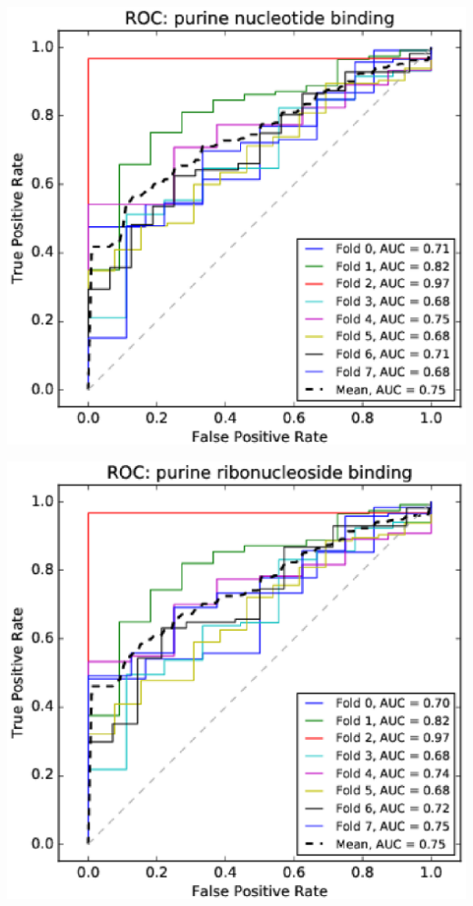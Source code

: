 \documentclass[11pt,twoside,a4paper]{book}
\newenvironment{Figure}
  {\par\medskip\noindent\minipage{\linewidth}}
  {\endminipage\par\medskip}
\begin{document}
\begin{multicols}{2}
\begin{Figure}\begin{center}\includegraphics[width=\linewidth]{figures/roc_purine_nucleotide_binding}\label{fig:roc_purine_nucleotide_binding}\end{center}\end{Figure}
\begin{Figure}\begin{center}\includegraphics[width=\linewidth]{figures/roc_purine_ribonucleoside_binding}\label{fig:roc_purine_ribonucleoside_binding}\end{center}\end{Figure}

\end{multicols}
\end{document}
